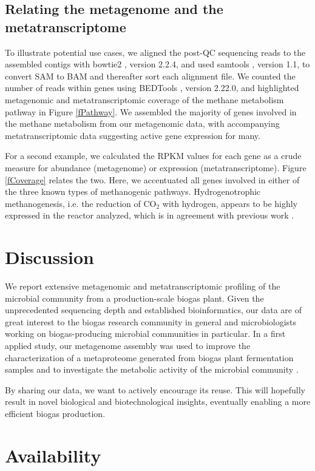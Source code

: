 \documentclass{bmcart}
\begin{document}
\subsection*{Relating the metagenome and the metatranscriptome}
To illustrate potential use cases, we aligned the post-QC sequencing reads to the assembled contigs with bowtie2 \cite{Bowtie2}, version 2.2.4, and used samtools \cite{Samtools}, version 1.1, to convert SAM to BAM and thereafter sort each alignment file. We counted the number of reads within genes using BEDTools \cite{BEDTools}, version 2.22.0, and highlighted metagenomic and metatranscriptomic coverage of the methane metabolism pathway in Figure \ref{fPathway}. We assembled the majority of genes involved in the methane metabolism from our metagenomic data, with accompanying metatranscriptomic data suggesting active gene expression for many.

For a second example, we calculated the RPKM values for each gene as a crude measure for abundance (metagenome) or expression (metatranscriptome).
Figure \ref{fCoverage} relates the two. Here, we accentuated all genes involved in either of the three known types of methanogenic pathways.
Hydrogenotrophic methanogenesis, i.e. the reduction of CO$_{\text{2}}$ with hydrogen, appears to be highly expressed in the reactor analyzed, which is in agreement with previous work \cite{Zakrzewski2012}.

\section*{Discussion}

We report extensive metagenomic and metatranscriptomic profiling of the microbial community from a production-scale biogas plant.
Given the unprecedented sequencing depth and established bioinformatics, our data are of great interest to the biogas research community in general and microbiologists working on biogas-producing microbial communities in particular.
In a first applied study, our metagenome assembly was used to improve the characterization of a metaproteome generated from biogas plant fermentation samples and to investigate the metabolic activity of the microbial community \cite{Kohrs2015}.

By sharing our data, we want to actively encourage its reuse. This will hopefully result in novel biological and biotechnological insights, eventually enabling a more efficient biogas production.

\section*{Availability}
\end{document}
